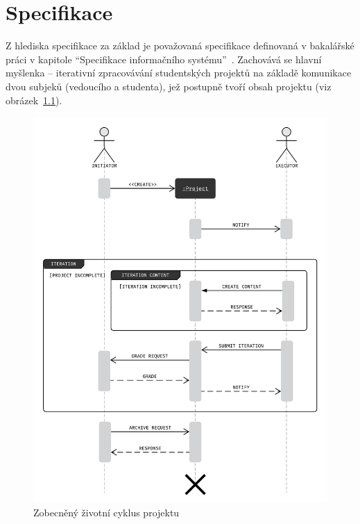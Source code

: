 \chapter{Specifikace}\label{ch:spec}


Z hlediska specifikace za základ je považovaná specifikace definovaná v bakalářské práci v kapitole \enquote{Specifikace informačního systému}~\cite{bachelorthesis}.
Zachovává se hlavní myšlenka – iterativní zpracovávání studentských projektů na základě komunikace dvou subjeků (vedoucího a studenta), jež postupně tvoří obsah projektu (viz obrázek~\ref{fig:main-communication-cycle}).

\begin{figure}[htbp]
   \centering
   \includegraphics[max width=\textwidth]{assets/dia-seq-study-project-lifecycle}
   \caption[Zobecněný životní cycklus projektu]{Zobecněný životní cyklus projektu~\cite{bachelorthesis}}\label{fig:main-communication-cycle}
\end{figure}



